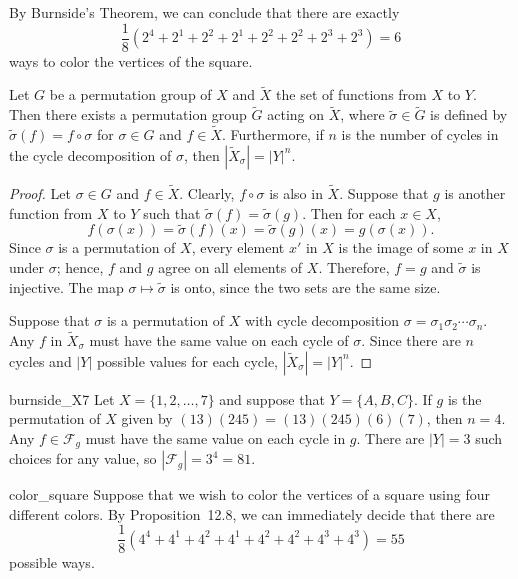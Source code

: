 By Burnside's Theorem, we can conclude that there are exactly
\[
\frac{1}{8} ( 2^4 + 2^1 + 2^2 + 2^1  + 2^2 + 2^2 +2^3 + 2^3)
= 6
\]
ways to color the vertices of the square.
 
 
\begin{proposition}
Let $G$ be a permutation group of $X$ and $\widetilde{X}$ the set of
functions from $X$ to $Y$. Then there exists a permutation group 
$\widetilde{G}$ acting on $\widetilde{X}$, where $\widetilde{\sigma} 
\in \widetilde{G}$ is defined by $\widetilde{\sigma}(f) = f \circ 
\sigma$ for $\sigma \in G$ and $f \in \widetilde{X}$. Furthermore, 
if $n$ is the number of cycles in the cycle decomposition 
of $\sigma$, then $|\widetilde{X}_{\sigma}| = |Y|^n$. 
\end{proposition}
 
 
\begin{proof}
Let $\sigma \in G$ and $f \in  \widetilde{X}$. Clearly, $f \circ
\sigma$ is also in $\widetilde{X}$. Suppose that $g$ is another
function from $X$ to $Y$ such that $\widetilde{\sigma}(f) =
\widetilde{\sigma}(g)$. Then for each $x \in X$,
\[
f( \sigma(x ))
= \widetilde{\sigma}(f)(x)
= \widetilde{\sigma}(g)(x)
= g( \sigma(x )).
\]
Since $\sigma$ is a permutation of $X$, every element $x'$ in $X$ is
the image of some $x$ in $X$ under $\sigma$; hence, $f$ and $g$ agree
on all elements of $X$. Therefore, $f=g$ and $\widetilde{\sigma}$ is
injective.  The map $\sigma \mapsto \widetilde{\sigma}$ is onto, since
the two sets are the same size.
 
 
Suppose that $\sigma$ is a permutation of $X$ with cycle decomposition
$\sigma = \sigma_1 \sigma_2 \cdots \sigma_n$. Any $f$ in
${\widetilde{X}}_{\sigma}$ must have the same value on each cycle of
$\sigma$. Since there are $n$ cycles and $|Y|$ possible values for
each cycle, $|{\widetilde{X}}_{\sigma}| = |Y|^n$.
\mbox{\hspace{1in}}
\end{proof}
 
 
\begin{example}{burnside_X7}
Let $X = \{1, 2, \ldots, 7\}$ and suppose that $Y = \{ A, B, C \}$. If
$g$ is the permutation of $X$ given by $(1 3)(2 4 5) = (1 3)(2 4
5)(6)(7)$, then $n = 4$. Any $f \in {\mathcal F}_g$ must have the same
value on each cycle in $g$. There are $|Y|=3$ such choices for any
value, so $|{\mathcal F}_g|  = 3^4 = 81$.
\end{example}
 
 
\begin{example}{color_square}
Suppose that we wish to color the vertices of a square using four
different colors. By Proposition~12.8, we can immediately
decide that there are 
\[
\frac{1}{8} (4^4 + 4^1 + 4^2 + 4^1 + 4^2 + 4^ 2 + 4^3 + 4^3)
=55
\]
possible ways.
\end{example}
 

